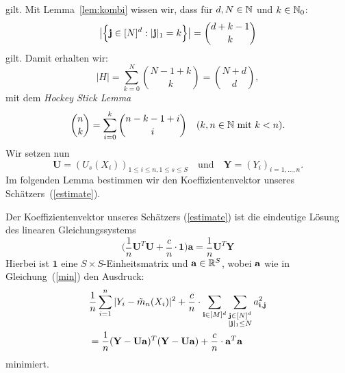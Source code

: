 gilt. Mit Lemma~\ref{lem:kombi} wissen wir, dass für $d, N \in \mathbb{N}$ und $k \in \mathbb{N}_0$:
$$\big|\Bigl\{\mathbf{j} \in [N]^d : |\mathbf{j}|_1 = k \Bigr\}\big| = \binom{d + k - 1}{k}$$ gilt.
Damit erhalten wir:
$$|H| = \sum_{k = 0}^N \binom{N - 1 + k}{k} = \binom{N + d}{d},$$
mit dem \emph{Hockey Stick Lemma}
$$\binom{n}{k} = \sum_{i = 0}^k \binom{n - k - 1 + i}{i} \quad (k, n \in \mathbb{N}  \text{ mit  } k < n).$$
Wir setzen nun 
$$ \mathbf{U} = (U_s(X_i))_{1\leq i \leq n,1\leq s \leq S} \quad \text{und} \quad \mathbf{Y} = (Y_i)_{i = 1,\dots,n}.$$
Im folgenden Lemma bestimmen wir den Koeffizientenvektor unseres Schätzers~(\ref{estimate}).
\begin{lem}
Der Koeffizientenvektor unseres Schätzers (\ref{estimate}) ist die eindeutige Lösung des linearen Gleichungssystems 
\begin{equation}	
\label{les}
\bigg(\frac{1}{n}\mathbf{U}^T\mathbf{U} + \frac{c}{n} \cdot \mathbf{1} \bigg) \mathbf{a} = \frac{1}{n} \mathbf{U}^T\mathbf{Y}
\end{equation}
Hierbei ist $\mathbf{1}$ eine $S \times S$-Einheitsmatrix und $\mathbf{a} \in \mathbb{R}^S$, wobei $\mathbf{a}$ wie in Gleichung~(\ref{min}) den Ausdruck:
\begin{equation}
\label{eq:min}
\begin{split}
& \frac{1}{n} \sum_{i = 1}^n|Y_i - \tilde{m}_n(X_i)|^2 + \frac{c}{n} \cdot \sum_{\mathbf{i} \in [M]^d} \sum_{\substack{\mathbf{j} \in [N]^d\\|\mathbf{j}|_1 \leq N}} a_{\mathbf{i},\mathbf{j}}^2 \\
& = \frac{1}{n}(\mathbf{Y} - \mathbf{U}\mathbf{a})^T(\mathbf{Y} - \mathbf{U}\mathbf{a}) + \frac{c}{n} \cdot \mathbf{a}^T\mathbf{a}
\end{split}
\end{equation}
minimiert.
\end{lem}
